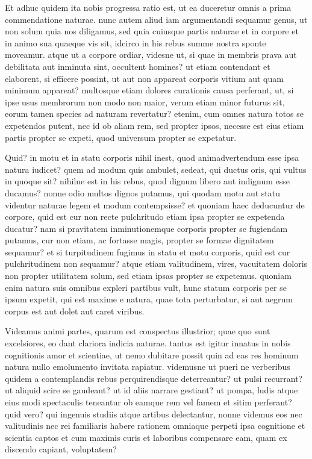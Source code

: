  Et adhuc quidem ita nobis progressa ratio est, ut ea duceretur omnis a prima commendatione naturae. nunc autem aliud iam argumentandi sequamur genus, ut non solum quia nos diligamus, sed quia cuiusque partis naturae et in corpore et in animo sua quaeque vis sit, idcirco in his rebus summe nostra sponte moveamur. atque ut a corpore ordiar, videsne ut, si quae in membris prava aut debilitata aut inminuta sint, occultent homines? ut etiam contendant et elaborent, si efficere possint, ut aut non appareat corporis vitium aut quam minimum appareat? multosque etiam dolores curationis causa perferant, ut, si ipse usus membrorum non modo non maior, verum etiam minor futurus sit, eorum tamen species ad naturam revertatur? etenim, cum omnes natura totos se expetendos putent, nec id ob aliam rem, sed propter ipsos, necesse est eius etiam partis propter se expeti, quod universum propter se expetatur.

 Quid? in motu et in statu corporis nihil inest, quod animadvertendum esse ipsa natura iudicet? quem ad modum quis ambulet, sedeat, qui ductus oris, qui vultus in quoque sit? nihilne est in his rebus, quod dignum libero aut indignum esse ducamus? nonne odio multos dignos putamus, qui quodam motu aut statu videntur naturae legem et modum contempsisse? et quoniam haec deducuntur de corpore, quid est cur non recte pulchritudo etiam ipsa propter se expetenda ducatur? nam si pravitatem inminutionemque corporis propter se fugiendam putamus, cur non etiam, ac fortasse magis, propter se formae dignitatem sequamur? et si turpitudinem fugimus in statu et motu corporis, quid est cur pulchritudinem non sequamur? atque etiam valitudinem, vires, vacuitatem doloris non propter utilitatem solum, sed etiam ipsas propter se expetemus. quoniam enim natura suis omnibus expleri partibus vult, hunc statum corporis per se ipsum expetit, qui est maxime e natura, quae tota perturbatur, si aut aegrum corpus est aut dolet aut caret viribus.

 Videamus animi partes, quarum est conspectus illustrior; quae quo sunt excelsiores, eo dant clariora indicia naturae. tantus est igitur innatus in nobis cognitionis amor et scientiae, ut nemo dubitare possit quin ad eas res hominum natura nullo emolumento invitata rapiatur. videmusne ut pueri ne verberibus quidem a contemplandis rebus perquirendisque deterreantur? ut pulsi recurrant? ut aliquid scire se gaudeant? ut id aliis narrare gestiant? ut pompa, ludis atque eius modi spectaculis teneantur ob eamque rem vel famem et sitim perferant? quid vero? qui ingenuis studiis atque artibus delectantur, nonne videmus eos nec valitudinis nec rei familiaris habere rationem omniaque perpeti ipsa cognitione et scientia captos et cum maximis curis et laboribus compensare eam, quam ex discendo capiant, voluptatem?

